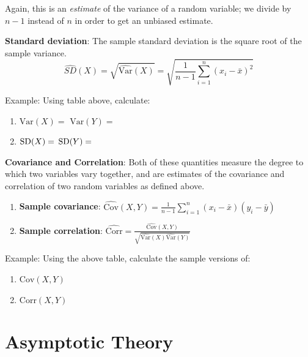 \documentclass[
]{book}
\begin{document}
Again, this is an \emph{estimate} of the variance of a random variable; we divide by \(n - 1\) instead of \(n\) in order to get an unbiased estimate.

\textbf{Standard deviation}: The sample standard deviation is the square root of the sample variance.
\[ \hat{SD}(X) = \sqrt{\hat{\text{Var}}(X)} = \sqrt{\frac{1}{n-1}\sum_{i = 1}^n (x_i - \bar{x})^2}\]

\begin{framed}
Example: Using table above, calculate: 
\begin{enumerate}
\item $\text{Var}(X) = $ \hspace{1.5cm} $\text{Var}(Y) =$
\item $\mathrm{SD}(X) = $ \hspace{1.65cm} $\mathrm{SD}(Y) =$
\end{enumerate}
\end{framed}

\textbf{Covariance and Correlation}: Both of these quantities measure the degree to which two variables vary together, and are estimates of the covariance and correlation of two random variables as defined above.

\begin{enumerate}
\def\labelenumi{\arabic{enumi}.}
\tightlist
\item
  \textbf{Sample covariance}: \(\hat{\text{Cov}}(X,Y) = \frac{1}{n-1}\sum_{i = 1}^n(x_i - \bar{x})(y_i - \bar{y})\)
\item
  \textbf{Sample correlation}: \(\hat{\text{Corr}} = \frac{\hat{\text{Cov}}(X,Y)}{\sqrt{\hat{\text{Var}}(X)\hat{\text{Var}}(Y)}}\)
\end{enumerate}

\begin{example}
\protect\hypertarget{exm:unnamed-chunk-94}{}\label{exm:unnamed-chunk-94}

Example: Using the above table, calculate the sample versions of:

\begin{enumerate}
\def\labelenumi{\arabic{enumi}.}
\tightlist
\item
  \(\text{Cov}(X,Y)\)
\item
  \(\text{Corr}(X, Y)\)
\end{enumerate}

\end{example}

\hypertarget{asymptotic-theory}{%
\section{Asymptotic Theory}\label{asymptotic-theory}}
\end{document}
